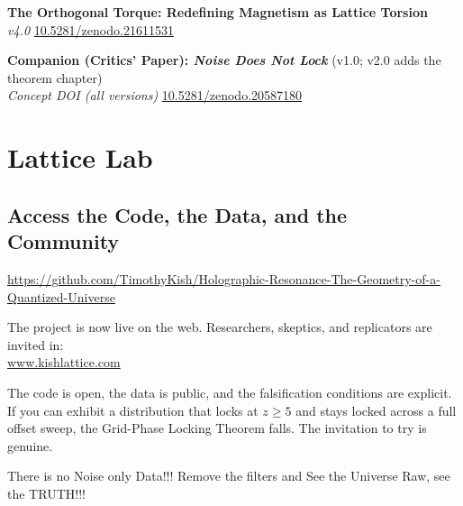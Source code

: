 \documentclass[12pt,oneside]{book}
\begin{document}
\vspace{1em}
\noindent\textbf{The Orthogonal Torque: Redefining Magnetism as Lattice Torsion}\\
\emph{v4.0} \href{https://doi.org/10.5281/zenodo.21611531}{10.5281/zenodo.21611531}

\vspace{1em}
\noindent\textbf{Companion (Critics' Paper): \emph{Noise Does Not Lock}} (v1.0; v2.0 adds the theorem chapter)\\
\emph{Concept DOI (all versions)} \href{https://doi.org/10.5281/zenodo.20587180}{10.5281/zenodo.20587180}


\chapter{Lattice Lab}
\section{Access the Code, the Data, and the Community}
\centering
{\large
\url{https://github.com/TimothyKish/Holographic-Resonance-The-Geometry-of-a-Quantized-Universe}
}

\vspace{1em}

{\large The project is now live on the web. Researchers, skeptics, and replicators are invited in:}\\[0.4em]
{\large\href{https://www.kishlattice.com}{www.kishlattice.com}}

\vspace{0.5em}

\noindent The code is open, the data is public, and the falsification conditions are explicit. If you can exhibit a distribution that locks at $z\ge 5$ and stays locked across a full offset sweep, the Grid-Phase Locking Theorem falls. The invitation to try is genuine.\

There is no Noise only Data!!! Remove the filters and See the Universe Raw, see the TRUTH!!!
\end{document}
